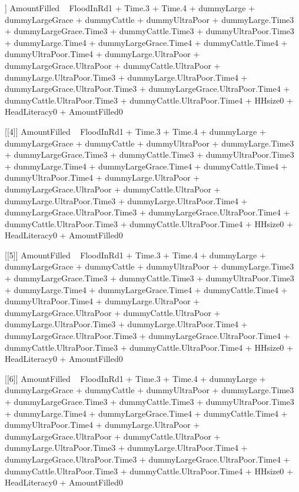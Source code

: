 \begin{Schunk}
\begin{Soutput}
[[3]]
AmountFilled ~ FloodInRd1 + Time.3 + Time.4 + dummyLarge + dummyLargeGrace + 
    dummyCattle + dummyUltraPoor + dummyLarge.Time3 + dummyLargeGrace.Time3 + 
    dummyCattle.Time3 + dummyUltraPoor.Time3 + dummyLarge.Time4 + 
    dummyLargeGrace.Time4 + dummyCattle.Time4 + dummyUltraPoor.Time4 + 
    dummyLarge.UltraPoor + dummyLargeGrace.UltraPoor + dummyCattle.UltraPoor + 
    dummyLarge.UltraPoor.Time3 + dummyLarge.UltraPoor.Time4 + 
    dummyLargeGrace.UltraPoor.Time3 + dummyLargeGrace.UltraPoor.Time4 + 
    dummyCattle.UltraPoor.Time3 + dummyCattle.UltraPoor.Time4 + 
    HHsize0 + HeadLiteracy0 + AmountFilled0

[[4]]
AmountFilled ~ FloodInRd1 + Time.3 + Time.4 + dummyLarge + dummyLargeGrace + 
    dummyCattle + dummyUltraPoor + dummyLarge.Time3 + dummyLargeGrace.Time3 + 
    dummyCattle.Time3 + dummyUltraPoor.Time3 + dummyLarge.Time4 + 
    dummyLargeGrace.Time4 + dummyCattle.Time4 + dummyUltraPoor.Time4 + 
    dummyLarge.UltraPoor + dummyLargeGrace.UltraPoor + dummyCattle.UltraPoor + 
    dummyLarge.UltraPoor.Time3 + dummyLarge.UltraPoor.Time4 + 
    dummyLargeGrace.UltraPoor.Time3 + dummyLargeGrace.UltraPoor.Time4 + 
    dummyCattle.UltraPoor.Time3 + dummyCattle.UltraPoor.Time4 + 
    HHsize0 + HeadLiteracy0 + AmountFilled0

[[5]]
AmountFilled ~ FloodInRd1 + Time.3 + Time.4 + dummyLarge + dummyLargeGrace + 
    dummyCattle + dummyUltraPoor + dummyLarge.Time3 + dummyLargeGrace.Time3 + 
    dummyCattle.Time3 + dummyUltraPoor.Time3 + dummyLarge.Time4 + 
    dummyLargeGrace.Time4 + dummyCattle.Time4 + dummyUltraPoor.Time4 + 
    dummyLarge.UltraPoor + dummyLargeGrace.UltraPoor + dummyCattle.UltraPoor + 
    dummyLarge.UltraPoor.Time3 + dummyLarge.UltraPoor.Time4 + 
    dummyLargeGrace.UltraPoor.Time3 + dummyLargeGrace.UltraPoor.Time4 + 
    dummyCattle.UltraPoor.Time3 + dummyCattle.UltraPoor.Time4 + 
    HHsize0 + HeadLiteracy0 + AmountFilled0

[[6]]
AmountFilled ~ FloodInRd1 + Time.3 + Time.4 + dummyLarge + dummyLargeGrace + 
    dummyCattle + dummyUltraPoor + dummyLarge.Time3 + dummyLargeGrace.Time3 + 
    dummyCattle.Time3 + dummyUltraPoor.Time3 + dummyLarge.Time4 + 
    dummyLargeGrace.Time4 + dummyCattle.Time4 + dummyUltraPoor.Time4 + 
    dummyLarge.UltraPoor + dummyLargeGrace.UltraPoor + dummyCattle.UltraPoor + 
    dummyLarge.UltraPoor.Time3 + dummyLarge.UltraPoor.Time4 + 
    dummyLargeGrace.UltraPoor.Time3 + dummyLargeGrace.UltraPoor.Time4 + 
    dummyCattle.UltraPoor.Time3 + dummyCattle.UltraPoor.Time4 + 
    HHsize0 + HeadLiteracy0 + AmountFilled0


\end{Soutput}
\end{Schunk}
